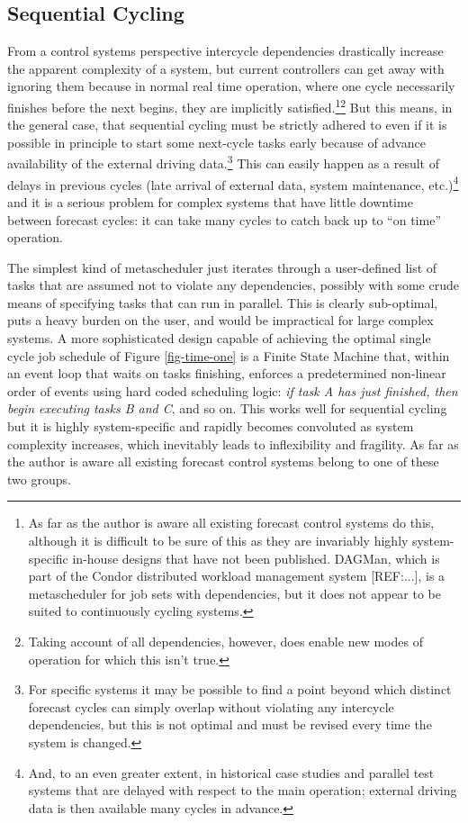 \documentclass[11pt,a4paper]{article}
\begin{document}
\subsection{Sequential Cycling}

From a control systems perspective intercycle dependencies drastically
increase the apparent complexity of a system, but current controllers
can get away with ignoring them because in normal real time operation,
where one cycle necessarily finishes before the next begins, they are
implicitly satisfied.\footnote{As far as the author is aware all
existing forecast control systems do this, although it is difficult to
be sure of this as they are invariably highly system-specific in-house
designs that have not been published. DAGMan, which is part of the
Condor distributed workload management system [REF:...], is a
metascheduler for job sets with dependencies, but it does not appear to
be suited to continuously cycling systems.}\footnote{Taking account of
all dependencies, however, does enable new modes of operation for which
this isn't true.}  But this means, in the general case, that sequential
cycling must be strictly adhered to even if it is possible in principle
to start some next-cycle tasks early because of advance availability of
the external driving data.\footnote{For specific systems it may be
possible to find a point beyond which distinct forecast cycles can
simply overlap without violating any intercycle dependencies, but this
is not optimal and must be revised every time the system is changed.}
This can easily happen as a result of delays in previous cycles (late
arrival of external data, system maintenance, etc.)\footnote{And, to an
even greater extent, in historical case studies and parallel test
systems that are delayed with respect to the main operation; external
driving data is then available many cycles in advance.} and it is a
serious problem for complex systems that have little downtime between
forecast cycles: it can take many cycles to catch back up to ``on time''
operation. 

The simplest kind of metascheduler just iterates through a user-defined
list of tasks that are assumed not to violate any dependencies, possibly
with some crude means of specifying tasks that can run in parallel. This
is clearly sub-optimal, puts a heavy burden on the user, and would be
impractical for large complex systems. A more sophisticated design
capable of achieving the optimal single cycle job schedule of Figure
\ref{fig-time-one} is a Finite State Machine that, within an event loop
that waits on tasks finishing, enforces a predetermined non-linear order
of events using hard coded scheduling logic: {\em if task A has just
finished, then begin executing tasks B and C}, and so on.  This works
well for sequential cycling but it is highly system-specific and rapidly
becomes convoluted as system complexity increases, which inevitably
leads to inflexibility and fragility. As far as the author is aware all
existing forecast control systems belong to one of these two groups.
\end{document}
